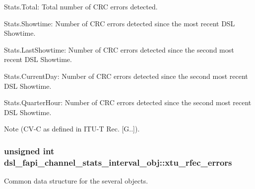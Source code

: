 \begin{DoxyItemize}
\item Stats.\-Total\-: Total number of C\-R\-C errors detected.
\item Stats.\-Showtime\-: Number of C\-R\-C errors detected since the most recent D\-S\-L Showtime.
\item Stats.\-Last\-Showtime\-: Number of C\-R\-C errors detected since the second most recent D\-S\-L Showtime.
\item Stats.\-Current\-Day\-: Number of C\-R\-C errors detected since the second most recent D\-S\-L Showtime.
\item Stats.\-Quarter\-Hour\-: Number of C\-R\-C errors detected since the second most recent D\-S\-L Showtime. \begin{DoxyNote}{Note}
(C\-V-\/\-C as defined in I\-T\-U-\/\-T Rec. \mbox{[}G..\mbox{]}). 
\end{DoxyNote}

\end{DoxyItemize}\hypertarget{structdsl__fapi__channel__stats__interval__obj_a731008204d97ec25bd89d3ac3c2ed7aa}{
\subsubsection[{xtu\-\_\-rfec\-\_\-errors}]{\setlength{\rightskip}{0pt plus 5cm}unsigned int dsl\-\_\-fapi\-\_\-channel\-\_\-stats\-\_\-interval\-\_\-obj\-::xtu\-\_\-rfec\-\_\-errors}}\label{structdsl__fapi__channel__stats__interval__obj_a731008204d97ec25bd89d3ac3c2ed7aa}
Common data structure for the several objects.

